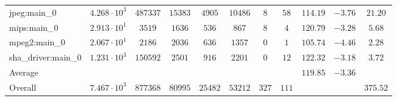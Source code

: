 \begin{tabular}{|l|c|c|c|c|c|c|c|c|c|c|}
jpeg:main\_0            & $ 4.268 \cdot 10^{3} $ & $ 487337 $ & $ 15383 $ & $ 4905  $ & $ 10486 $ & $ 8   $ & $ 58  $ & $ 114.19      $ & $ -3.76   $ & $ 21.20   $ \\
mips:main\_0            & $ 2.913 \cdot 10^{1} $ & $ 3519   $ & $ 1636  $ & $ 536   $ & $ 867   $ & $ 8   $ & $ 4   $ & $ 120.79      $ & $ -3.28   $ & $ 5.68    $ \\
mpeg2:main\_0           & $ 2.067 \cdot 10^{1} $ & $ 2186   $ & $ 2036  $ & $ 636   $ & $ 1357  $ & $ 0   $ & $ 1   $ & $ 105.74      $ & $ -4.46   $ & $ 2.28    $ \\
sha\_driver:main\_0     & $ 1.231 \cdot 10^{3} $ & $ 150592 $ & $ 2501  $ & $ 916   $ & $ 2201  $ & $ 0   $ & $ 12  $ & $ 122.32      $ & $ -3.18   $ & $ 3.72    $ \\
\hline
Average                 & $                    $ & $        $ & $       $ & $       $ & $       $ & $     $ & $     $ & $ 119.85      $ & $ -3.36   $ & $         $ \\
\hline
Overall                 & $ 7.467 \cdot 10^{3} $ & $ 877368 $ & $ 80995 $ & $ 25482 $ & $ 53212 $ & $ 327 $ & $ 111 $ & $             $ & $         $ & $ 375.52  $ \\
\hline
\end{tabular}
